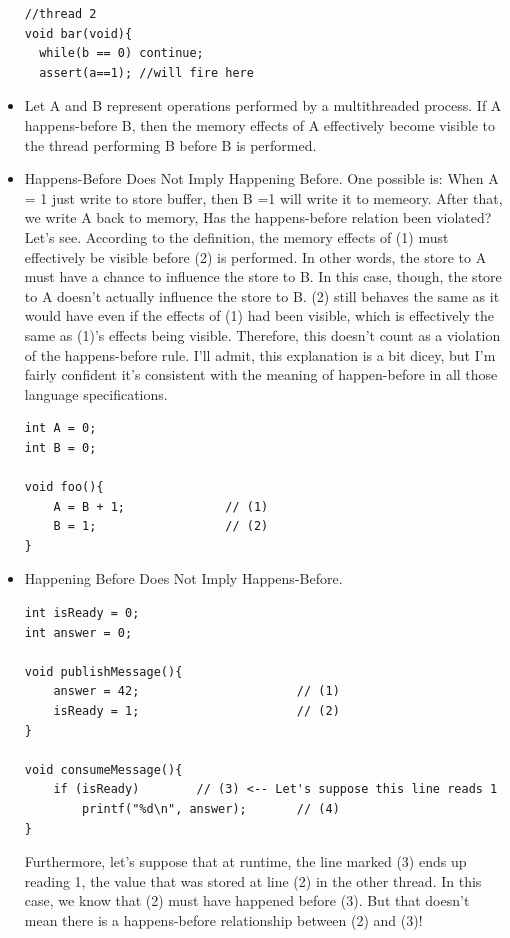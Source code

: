 \documentclass[a4paper,11pt,twoside]{book}
\begin{document}
\begin{itemize}
\begin{lstlisting}
//thread 2
void bar(void){
  while(b == 0) continue;
  assert(a==1); //will fire here
\end{lstlisting}

\item Let A and B represent operations performed by a multithreaded process. If A happens-before B, then the memory effects of A effectively become visible to the thread performing B before B is performed.


\item Happens-Before Does Not Imply Happening Before. One possible is: When A = 1 just write to store buffer, then B =1 will write it to memeory. After that, we write A back to memory, 
Has the happens-before relation been violated? Let’s see. According to the definition, the memory effects of (1) must effectively be visible before (2) is performed. In other words, the store to A must have a chance to influence the store to B. In this case, though, the store to A doesn’t actually influence the store to B. (2) still behaves the same as it would have even if the effects of (1) had been visible, which is effectively the same as (1)’s effects being visible. Therefore, this doesn’t count as a violation of the happens-before rule. I’ll admit, this explanation is a bit dicey, but I’m fairly confident it’s consistent with the meaning of happen-before in all those language specifications.

\begin{lstlisting}
int A = 0;
int B = 0;

void foo(){
    A = B + 1;              // (1)
    B = 1;                  // (2)
}
\end{lstlisting}

		\item Happening Before Does Not Imply Happens-Before.
\begin{lstlisting}
int isReady = 0;
int answer = 0;

void publishMessage(){
    answer = 42;                      // (1)
    isReady = 1;                      // (2)
}

void consumeMessage(){
    if (isReady)        // (3) <-- Let's suppose this line reads 1
        printf("%d\n", answer);       // (4)
}
\end{lstlisting}

Furthermore, let’s suppose that at runtime, the line marked (3) ends up reading 1, the value that was stored at line (2) in the other thread. In this case, we know that (2) must have happened before (3). But that doesn’t mean there is a happens-before relationship between (2) and (3)!


\end{itemize}
\end{document}
